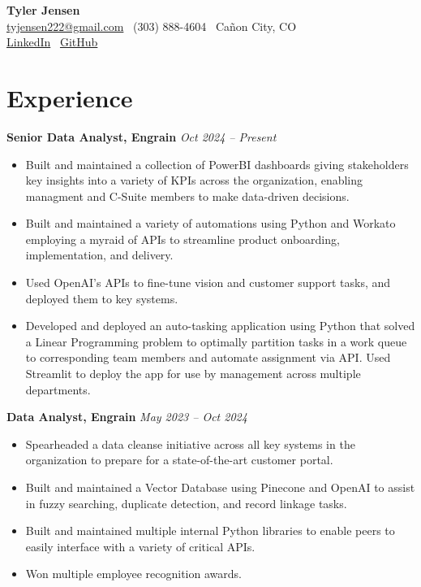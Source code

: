 \documentclass[a4paper,10pt]{article}
\newcommand{\resumeEntry}[2]{%
  \noindent\textbf{#1} \hfill \textit{#2}\par\vspace{-0.5ex}%
}
\begin{document}
\pagestyle{empty}
\small

\begin{center}
    {\LARGE \textbf{Tyler Jensen}}\\[2mm]
    \small
    \href{mailto:tyjensen222@gmail.com}{tyjensen222@gmail.com} \textbullet\ 
    (303) 888-4604 \textbullet\ Ca\~{n}on City, CO \\
    \href{https://www.linkedin.com/in/tyler-jensen-923130181}{LinkedIn} \textbullet\ 
    \href{https://github.com/yourprofile}{GitHub}
\end{center}

\vspace{0.25cm}

\section*{Experience}

\resumeEntry{Senior Data Analyst, Engrain}{Oct 2024 -- Present}
\begin{itemize}[leftmargin=*, noitemsep]
    \item Built and maintained a collection of PowerBI dashboards giving stakeholders key insights into a variety of
    KPIs across the organization, enabling managment and C-Suite members to make data-driven decisions.
    \item Built and maintained a variety of automations using Python and Workato employing a myraid of APIs to streamline product onboarding, implementation,
    and delivery.
    \item Used OpenAI's APIs to fine-tune vision and customer support tasks, and deployed them to key systems.
    \item Developed and deployed an auto-tasking application using Python that solved a Linear Programming problem to optimally
    partition tasks in a work queue to corresponding team members and automate assignment via API.
    Used Streamlit to deploy the app for use by management across multiple departments.
\end{itemize}

\resumeEntry{Data Analyst, Engrain}{May 2023 -- Oct 2024}
\begin{itemize}[leftmargin=*, noitemsep]
    \item Spearheaded a data cleanse initiative across all key systems in the organization to prepare for 
    a state-of-the-art customer portal.
    \item Built and maintained a Vector Database using Pinecone and OpenAI to assist in fuzzy searching, duplicate detection, and record linkage tasks.
    \item Built and maintained multiple internal Python libraries to enable peers to easily interface
    with a variety of critical APIs.
    \item Won multiple employee recognition awards.
\end{itemize}
\end{document}
